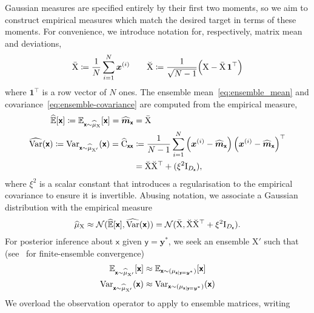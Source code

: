 \documentclass[runningheads]{llncs}
\newcommand{\Ex}{\mathbb{E}}
\newcommand{\var}{\operatorname{Var}}
\newcommand{\vv}[1]{\boldsymbol{#1}}
\newcommand{\mm}[1]{\mathrm{#1}}
\newcommand{\mmmean}[1]{\bar{\mathrm{#1}}}
\newcommand{\mmdev}[1]{\breve{\mathrm{#1}}}
\newcommand{\rv}[1]{\mathsf{#1}}
\newcommand{\vrv}[1]{\vv{\rv{#1}}}
\newcommand{\Normal}{\mathcal{N}}
\newcommand{\gvn}{\mid}
\begin{document}
Gaussian measures are specified entirely by their first two moments, so we aim to construct empirical measures which match the desired target in terms of these moments.
For convenience, we introduce notation for, respectively, matrix mean and deviations,
\begin{align}
    \mmmean{X} \coloneq \frac{1}{N}\sum_{i=1}^N \vv{x}^{(i)}
    \quad\quad
    \mmdev{X} \coloneq \frac{1}{\sqrt{N-1}} \Bigl( \mm{X} - \mmmean{X}\,\vv{1}^\top \Bigr)
     \label{eq:deviation_matrix}
\end{align}
where \(\vv{1}^\top\) is a row vector of \(N\) ones.
The ensemble mean~\eqref{eq:ensemble_mean} and covariance~\eqref{eq:ensemble-covariance} are computed from the empirical measure,
\begin{align}
    \widehat{\Ex}[\vrv{x}]\coloneq \Ex_{\vrv{x}\sim \ELaw[\mm{X}]}[ \vrv{x}] =\widehat{\vv{m}}_{\vrv{x}}
&=\mmmean{X}\label{eq:ensemble_mean} \\
\widehat{\var}(\vrv{x}) \coloneq\var_{\vrv{x}\sim \ELaw[\mm{X}']} (\vrv{x})=\widehat{\mm{C}}_{\vrv{xx}} &\coloneq \frac{1}{N-1} \sum_{i=1}^{N} \left(\vv{x}^{(i)} - \widehat{\vv{m}}_{\vrv{x}}\right)\left(\vv{x}^{(i)} - \widehat{\vv{m}}_{\vrv{x}}\right)^\top  \\
&=\mmdev{X} \mmdev{X}^\top + (\xi^2\mm{I}_{D_{\vrv{x}}}),\label{eq:ensemble-covariance}
\end{align}
where \(\xi^2\) is a scalar constant that introduces a regularisation to the empirical covariance to ensure it is invertible.
Abusing notation, we associate a Gaussian distribution with the empirical measure
\begin{align}
\ELaw[\mm{X}] \approx \Normal(\widehat{\Ex}[\vrv{x}], \widehat{\var}(\vrv{x})) = \Normal(\mmmean{X}, \mmdev{X} \mmdev{X}^\top + \xi^2\mm{I}_{D_{\vrv{x}}}).
\end{align}
For posterior inference about $\vrv{x}$ given $\vrv{y}=\vv{y}^*$, we seek an ensemble $\mm{X}'$ such that (see~\cite{LeGland2009Large,Mandel2011Convergence,Kelly2014Wellposedness,Kwiatkowski2015Convergence,DelMoral2017Stability} for finite-ensemble convergence)
\begin{align}
    \Ex_{\vrv{x}\sim \ELaw[\mm{X}']}[ \vrv{x}] &\approx \Ex_{\vrv{x}\sim (\Law[\vrv{x} \gvn \vrv{y}=\vv{y}^*])} [\vrv{x}]\\
    \var_{\vrv{x}\sim \ELaw[\mm{X}']} (\vrv{x}) &\approx \var_{\vrv{x}\sim (\Law[\vrv{x} \gvn \vrv{y}=\vv{y}^*])} (\vrv{x})
\end{align}
We overload the observation operator to apply to ensemble matrices, writing
\end{document}
